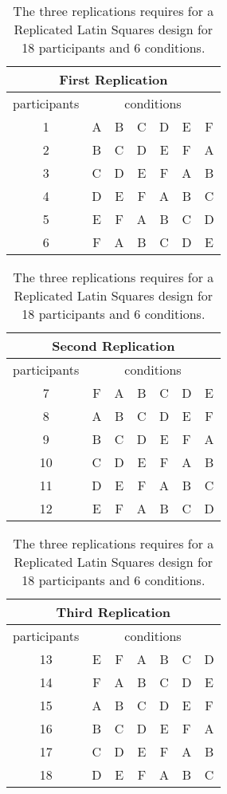 \begin{table}[!t] %
	\centering
	\caption[Replicated Latin Squares Example]{\centering The three replications requires for a Replicated Latin Squares design for 18 participants and 6 conditions.}
	\label{final_latin_squares_rep}
	\begin{tabular}{c | c c c c c c}
		\multicolumn{7}{c}{First Replication} \\
		\hline
		participants & \multicolumn{6}{c}{conditions} \\
		\hline
		1 & A & B & C & D & E & F \\
		2 & B & C & D & E & F & A \\
		3 & C & D & E & F & A & B \\
		4 & D & E & F & A & B & C \\
		5 & E & F & A & B & C & D \\
		6 & F & A & B & C & D & E \\
		\hline
	\end{tabular}
	
	\vspace*{5mm}
	
	\begin{tabular}{c | c c c c c c}
		\multicolumn{7}{c}{Second Replication} \\
		\hline
		participants & \multicolumn{6}{c}{conditions} \\
		\hline
		7 & F & A & B & C & D & E \\
		8 & A & B & C & D & E & F \\
		9 & B & C & D & E & F & A \\
		10 & C & D & E & F & A & B \\
		11 & D & E & F & A & B & C \\
		12 & E & F & A & B & C & D \\
		\hline
	\end{tabular}
	
	\vspace*{5mm}
	
	\begin{tabular}{c | c c c c c c}
		\multicolumn{7}{c}{Third Replication} \\
		\hline
		participants & \multicolumn{6}{c}{conditions} \\
		\hline
		13 & E & F & A & B & C & D \\
		14 & F & A & B & C & D & E \\
		15 & A & B & C & D & E & F \\
		16 & B & C & D & E & F & A \\
		17 & C & D & E & F & A & B \\
		18 & D & E & F & A & B & C \\
		\hline
	\end{tabular}
\end{table}

